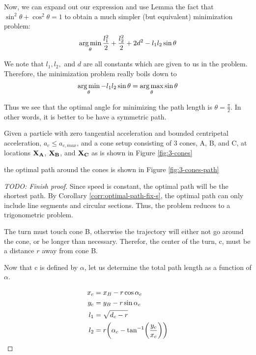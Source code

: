 Now, we can expand out our expression and use Lemma the fact that $\sin^2 \theta + \cos^2 \theta = 1$ to obtain a much simpler (but equivalent) minimization problem:
\begin{eqnarray}
  \operatorname*{arg\,min}_{\theta} \frac{l_1^2}{2} + \frac{l_2^2}{2} + 2d^2 - l_1 l_2 \sin \theta
\end{eqnarray}

We note that $l_1, l_2,$ and $d$ are all constants which are given to us in the problem. Therefore, the minimization problem really boils down to
\begin{eqnarray}
  \operatorname*{arg\,min}_{\theta} - l_1 l_2 \sin \theta = \operatorname*{arg\,max}_{\theta} \sin \theta
\end{eqnarray}

Thus we see that the optimal angle for minimizing the path length is $\theta = \frac{\pi}{2}$. In other words, it is better to be have a symmetric path.


\begin{theorem}

Given a particle with zero tangential acceleration and bounded centripetal acceleration, $a_c \le a_{c,max}$, and a cone setup consisting of 3 cones, A, B, and C, at locations $\mathbf{X_A}$, $\mathbf{X_B}$, and $\mathbf{X_C}$ as is shown in Figure \ref{fig:3-cones}


the optimal path around the cones is shown in Figure \ref{fig:3-cones-path}


\end{theorem}

\begin{proof}
[TODO: Finish proof]

Since speed is constant, the optimal path will be the shortest path. By Corollary \ref{corr:optimal-path-fix-s}, the optimal path can only include line segments and circular sections. Thus, the problem reduces to a trigonometric problem.

The turn must touch cone B, otherwise the trajectory will either not go around the cone, or be longer than necessary. Therefor, the center of the turn, c, must be a distance $r$ away from cone B.


Now that c is defined by $\alpha$, let us determine the total path length as a function of $\alpha$.


\begin{align*}
x_c& = x_B - r \cos{\alpha_c}\\
y_c& = y_B - r \sin{\alpha_c}\\
l_1& = \sqrt{d_c - r}\\
l_2& = r \paren{\alpha_c - \tan^{-1}\paren{\frac{y_c}{x_c}}}\\
\end{align*}
\end{proof}
